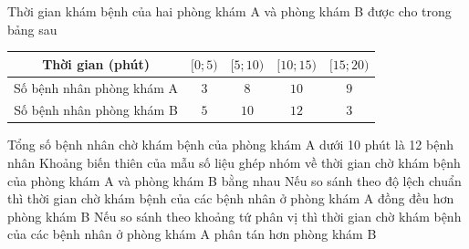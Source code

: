 \begin{ex}%
	Thời gian khám bệnh của hai phòng khám A và phòng khám B được cho trong bảng sau
	\begin{center}
		\begin{longtable}{|c|c|c|c|c|}
			\hline
			Thời gian (phút) & $[0;5)$ & $[5;10)$ & $[10;15)$ & $[15;20)$ \\
			\hline
			Số bệnh nhân phòng khám A & $3$ & $8$ & $10$& $9$ \\
			\hline
			Số bệnh nhân phòng khám B & $5$ & $10$ & $12$ & $3$ \\
			\hline
		\end{longtable}
	\end{center}
	\choiceTF
	{Tổng số bệnh nhân chờ khám bệnh của phòng khám A dưới 10 phút là 12 bệnh nhân}
	{\True Khoảng biến thiên của mẫu số liệu ghép nhóm về thời gian chờ khám bệnh của phòng khám A và phòng khám B bằng nhau}
	{Nếu so sánh theo độ lệch chuẩn thì thời gian chờ khám bệnh của các bệnh nhân ở phòng khám A đồng đều hơn phòng khám B}
	{\True Nếu so sánh theo khoảng tứ phân vị thì thời gian chờ khám bệnh của các bệnh nhân ở phòng khám A phân tán hơn phòng khám B}
	

\end{ex}
